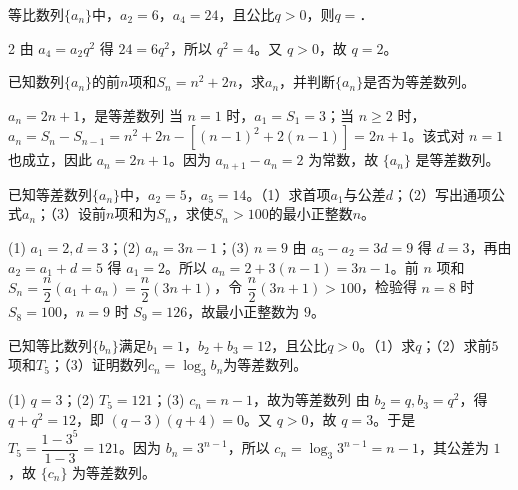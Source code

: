 
\begin{question}[GPT生成]
等比数列$\{a_n\}$中，$a_2=6$，$a_4=24$，且公比$q>0$，则$q=$\blank{3cm}．
\end{question}
\begin{answer}{2}
由 $a_4=a_2q^2$ 得 $24=6q^2$，所以 $q^2=4$。又 $q>0$，故 $q=2$。
\end{answer}



\begin{question}[GPT生成]
已知数列$\{a_n\}$的前$n$项和$S_n=n^2+2n$，求$a_n$，并判断$\{a_n\}$是否为等差数列。
\end{question}
\begin{answer}{$a_n=2n+1$，是等差数列}
当 $n=1$ 时，$a_1=S_1=3$；当 $n\ge2$ 时，$a_n=S_n-S_{n-1}=n^2+2n-[(n-1)^2+2(n-1)]=2n+1$。该式对 $n=1$ 也成立，因此 $a_n=2n+1$。因为 $a_{n+1}-a_n=2$ 为常数，故 $\{a_n\}$ 是等差数列。
\end{answer}



\begin{question}[GPT生成]
已知等差数列$\{a_n\}$中，$a_2=5$，$a_5=14$。（1）求首项$a_1$与公差$d$；（2）写出通项公式$a_n$；（3）设前$n$项和为$S_n$，求使$S_n>100$的最小正整数$n$。
\end{question}
\solutionSpace{5cm}
\begin{answer}{(1) $a_1=2,d=3$；(2) $a_n=3n-1$；(3) $n=9$}
由 $a_5-a_2=3d=9$ 得 $d=3$，再由 $a_2=a_1+d=5$ 得 $a_1=2$。所以 $a_n=2+3(n-1)=3n-1$。前 $n$ 项和 $S_n=\dfrac n2(a_1+a_n)=\dfrac n2(3n+1)$，令 $\dfrac n2(3n+1)>100$，检验得 $n=8$ 时 $S_8=100$，$n=9$ 时 $S_9=126$，故最小正整数为 $9$。
\end{answer}

\begin{question}[GPT生成]
已知等比数列$\{b_n\}$满足$b_1=1$，$b_2+b_3=12$，且公比$q>0$。（1）求$q$；（2）求前$5$项和$T_5$；（3）证明数列$c_n=\log_3 b_n$为等差数列。
\end{question}
\solutionSpace{5cm}
\begin{answer}{(1) $q=3$；(2) $T_5=121$；(3) $c_n=n-1$，故为等差数列}
由 $b_2=q,b_3=q^2$，得 $q+q^2=12$，即 $(q-3)(q+4)=0$。又 $q>0$，故 $q=3$。于是 $T_5=\dfrac{1-3^5}{1-3}=121$。因为 $b_n=3^{n-1}$，所以 $c_n=\log_3 3^{n-1}=n-1$，其公差为 $1$，故 $\{c_n\}$ 为等差数列。
\end{answer}

\printChapterAnswers
